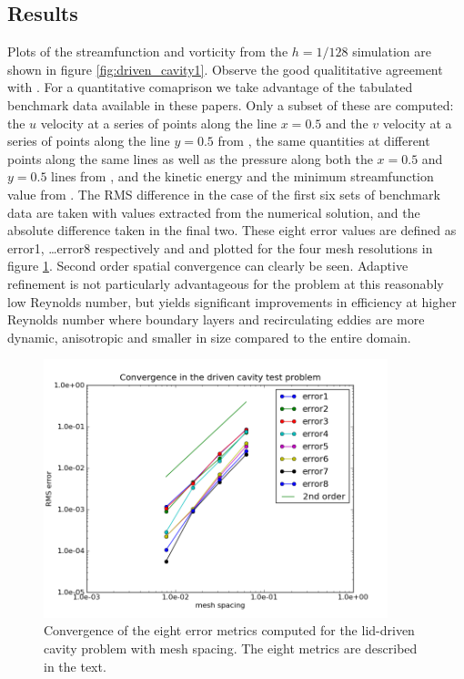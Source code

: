 \subsection{Results}
Plots of the streamfunction and vorticity from the $h=1/128$ simulation are shown in figure \ref{fig:driven_cavity1}.
Observe the good qualititative agreement with \citep{botella1998,erturk2005,bruneau2006}. 
For a quantitative comaprison we take advantage of the tabulated benchmark data available in these papers.
Only a subset of these are computed: the $u$ velocity at a series of points along the line $x=0.5$ and the
$v$ velocity at a series of points along the line $y=0.5$ from \citep{erturk2005}, the same quantities at
different points along the same lines as well as the pressure along both the $x=0.5$ and $y=0.5$ lines from 
\citep{botella1998}, and the kinetic energy and the minimum streamfunction value from \citep{bruneau2006}.
The RMS difference in the case of the first six sets of benchmark data are taken with values extracted from 
the numerical solution, and the absolute difference taken in the final two. These eight error values are
defined as error1, \ldots error8 respectively and and plotted for the four mesh resolutions in figure 
\ref{fig:driven_cavity2}.
Second order spatial convergence can clearly be seen.
Adaptive refinement is not particularly advantageous for the problem at this reasonably low Reynolds number, but
yields significant improvements in efficiency at higher Reynolds number where boundary layers and
recirculating eddies are more dynamic, anisotropic and smaller in size compared to the entire domain.

\begin{figure}
\centering
\includegraphics[width=10cm,clip]{examples_images/driven_cavity_2d/driven_cavity_error_plot.png}
\caption{Convergence of the eight error metrics computed for the lid-driven cavity problem with mesh spacing. The eight
metrics are described in the text.}
\label{fig:driven_cavity2}
\end{figure}


